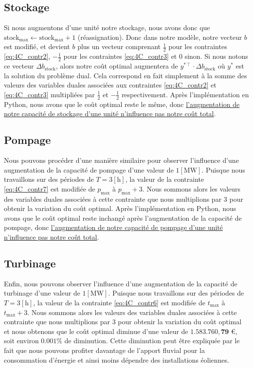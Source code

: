 \documentclass{article}
\newcommand{\unit}[1]{[\mathrm{#1}]}
\begin{document}
\subsection*{Stockage}
Si nous augmentons d'une unité notre stockage, nous avons donc que $\mathrm{stock}_\mathrm{max} \leftarrow \mathrm{stock}_\mathrm{max} + 1$ (réassignation). Donc dans notre modèle,
notre vecteur $b$ est modifié, et devient $b$ plus un vecteur comprenant $\frac{1}{2}$ pour les contraintes 
\eqref{eq:4C_contr2}, $-\frac{1}{2}$ pour les contraintes \eqref{eq:4C_contr3} et 0 sinon. Si nous notons ce vecteur $\Delta b_{\mathrm{stock}}$, alors notre coût optimal augmentera de
$y^{* \intercal}\cdot \Delta b_{\mathrm{stock}}$ où $y^{*}$ est la solution du problème dual. Cela correspond en fait simplement à la somme des valeurs des variables duales associées aux contraintes
\eqref{eq:4C_contr2} et \eqref{eq:4C_contr3} multipliées par $\frac{1}{2}$ et $-\frac{1}{2}$ respectivement. Après l'implémentation en Python, nous avons que le coût optimal reste le même, donc \underline{l'augmentation de notre capacité de stockage d'une unité n'influence pas notre coût total}.

\subsection*{Pompage}
Nous pouvons procéder d'une manière similaire pour observer l'influence d'une augmentation de la capacité de pompage d'une valeur de $1 \unit{MW}$.
Puisque nous travaillons sur des périodes de $T = 3 \unit{h}$, la valeur de la contrainte \eqref{eq:4C_contr7} est modifiée de $p_\mathrm{max}$ à $p_\mathrm{max} + 3$. 
Nous sommons alors les valeurs des variables duales associées à cette contrainte que nous multiplions par $3$ pour obtenir la variation du coût optimal. 
Après l'implémentation en Python, nous avons que le coût optimal reste inchangé après l'augmentation de la capacité de pompage, donc \underline{l'augmentation de notre capacité de pompage d'une unité n'influence pas notre coût total}.

\subsection*{Turbinage}
Enfin, nous pouvons observer l'influence d'une augmentation de la capacité de turbinage d'une valeur de $1 \unit{MW}$.
Puisque nous travaillons sur des périodes de $T = 3 \unit{h}$, la valeur de la contrainte \eqref{eq:4C_contr6} est modifiée de $t_\mathrm{max}$ à $t_\mathrm{max} + 3$.
Nous sommons alors les valeurs des variables duales associées à cette contrainte que nous multiplions par $3$ pour obtenir la variation du coût optimal 
et nous obtenons que le coût optimal diminue d'une valeur de $\mathbf{1.583.760,79}$ \euro, soit environ $0.001$\% de diminution. Cette diminution peut être expliquée par le fait que nous pouvons profiter davantage de l'apport fluvial pour la consommation d'énergie et ainsi moins dépendre des installations éoliennes.\\ 
\end{document}
